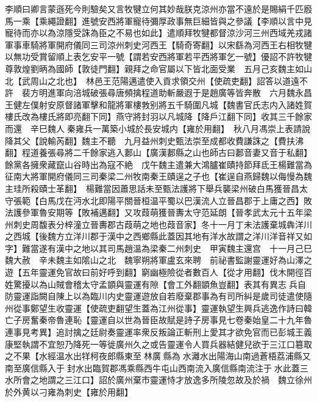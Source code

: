 李順曰卿言蒙遜死今則驗矣又言牧犍立何其妙哉朕克涼州亦當不遠於是賜絹千匹廏馬一乘【乘繩證翻】進號安西將軍寵待彌厚政事無巨細皆與之參議【李順以言中見寵待而亦以為涼隱受誅為臣之不易也如此】遣順拜牧犍都督涼沙河三州西域羌戎諸軍事車騎將軍開府儀同三司涼州刺史河西王【騎奇寄翻】以宋繇為河西王右相牧犍以無功受賞留順上表乞安平一號【謂若安西將軍若平西將軍乞一號】優詔不許牧犍尊敦煌劉昞為國師【敦徒門翻】親拜之命官屬以下皆北面受業　五月己亥魏主如山北【武周山之北也】　林邑王范陽邁遣使入貢求領交州【使疏吏翻】詔答以道遠不許　裴方明進軍向涪城破張尋唐頻擒程道助斬嚴遐于是趙廣等皆奔散　六月魏永昌王健左僕射安原督諸軍擊和龍將軍樓㪍别將五千騎圍凡城【魏書官氏志内入諸姓賀樓氏改為樓氏將即亮翻下同】燕守將封羽以凡城降【降戶江翻下同】收其三千餘家而還　辛巳魏人秦雍兵一萬築小城於長安城内【雍於用翻】　秋八月馮崇上表請說降其父【說輸芮翻】魏主不聽　九月益州刺史甄法崇至成都收費謙誅之【費扶沸翻】程道養張尋將二千餘家逃入郪山【廣漢郪縣之山也師古曰郪音妻又音于私翻】餘黨各擁衆藏竄山谷時出為寇不絶　戊午魏主遣兼大鴻臚崔賾持節拜氐王楊難當為征南大將軍開府儀同三司秦梁二州牧南秦王賾逞之子也【崔逞自燕歸魏以侮慢為魏主珪所殺賾士革翻】　楊難當因蕭思話未至甄法護將下舉兵襲梁州破白馬獲晉昌太守張範【白馬戊在沔水北即陽平關晉桓温平蜀以巴漢流人立晉昌郡于上庸之西】敗法護參軍魯安期等【敗補邁翻】又攻葭萌獲晉夀太守范延朗【晉孝武太元十五年梁州刺史周馥表分梓潼立晉夀郡古葭萌之地也葭音家】冬十一月丁未法護棄城犇洋川之西城【後魏方立洋川郡于漢中之西鄉縣此蓋因其地有洋水故謂之洋川洋音祥又如字】難當遂有漢中之地以其司馬趙溫為梁秦二州刺史　甲寅魏主還宫　十一月己巳魏大赦　辛未魏主如隂山之北　魏寧朔將軍盧玄來聘　前祕書監謝靈運好為山澤之遊【五年靈運免官故曰前好呼到翻】窮幽極險從者數百人【從才用翻】伐木開徑百姓驚擾以為山賊會稽太守孟顗與靈運有隙【會工外翻顗魚豈翻】表其有異志兵自防靈運詣闕自陳上以為臨川内史靈運遊放自若廢棄郡事為有司所糾是歲司徒遣使隨州從事鄭望生收靈運【使疏吏翻望生蓋為江州從事】靈運執望生興兵逃逸作詩曰韓亡子房奮秦帝魯連恥【靈運自以世為晉臣故賦是詩子房事見七卷秦始皇二十九年魯連事見考異】追討擒之廷尉奏靈運率衆反叛論正斬刑上愛其才欲免官而已彭城王義康堅執謂不宜恕乃降死一等徙廣州久之或告靈運令人買兵器結健兒欲于三江口簒取之不果【水經温水出䍧柯夜郎縣東至林廣縣為水灕水出陽海山南過蒼梧荔浦縣又南至廣信縣入于封水出臨賀郡馮乘縣西牛屯山西南流入廣信縣南流注于水此蓋三水所會之地謂之三江口】詔於廣州棄市靈運恃才放逸多所陵忽故及於禍　魏立徐州於外黄以刁雍為刺史【雍於用翻】

